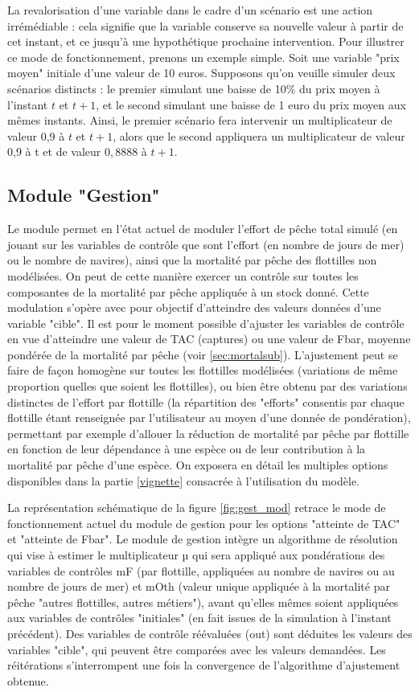 \documentclass[12pt, colorinlistoftodos, notitlepage]{report}
\newenvironment{not used}[1]{%
    \longtable{%
        |>{\centering$\displaystyle}A{#1}{1}<{$}%
        |}\hline\ignorespaces}{%
    \endlongtable\ignorespacesafterend}
\begin{document}
La revalorisation d'une variable dans le cadre d'un scénario est une action irrémédiable : cela signifie que la variable conserve sa nouvelle valeur à partir de cet instant, et ce jusqu'à une hypothétique prochaine intervention. Pour illustrer ce mode de fonctionnement, prenons un exemple simple. Soit une variable "prix moyen" initiale d'une valeur de 10 euros. Supposons qu'on veuille simuler deux scénarios distincts : le premier simulant une baisse de 10\% du prix moyen à l'instant $t$ et $t+1$, et le second simulant une baisse de 1 euro du prix moyen aux mêmes instants. Ainsi, le premier scénario fera intervenir un multiplicateur de valeur 0,9 à $t$ et $t+1$, alors que le second appliquera un multiplicateur de valeur 0,9 à t et de valeur $0,8888$ à $t+1$.

\subsection{Module "Gestion"}

Le module permet en l'état actuel de moduler l'effort de pêche total simulé (en jouant sur les variables de contrôle que sont l’effort (en nombre de jours de mer) ou le nombre de navires), ainsi que la mortalité par pêche des flottilles non modélisées. On peut de cette manière exercer un contrôle sur toutes les composantes de la mortalité par pêche appliquée à un stock donné. Cette modulation s'opère avec pour objectif d'atteindre des valeurs données d'une variable "cible". Il est pour le moment possible d'ajuster les variables de contrôle en vue d'atteindre une valeur de TAC (captures) ou une valeur de Fbar, moyenne pondérée de la mortalité par pêche (voir \ref{sec:mortalsub}). L'ajustement peut se faire de façon homogène sur toutes les flottilles modélisées (variations de même proportion quelles que soient les flottilles), ou bien être obtenu par des variations distinctes de l'effort par flottille (la répartition des "efforts" consentis par chaque flottille étant renseignée par l'utilisateur au moyen d'une donnée de pondération), permettant par exemple d'allouer la réduction de mortalité par pêche par flottille en fonction de leur dépendance à une espèce ou de leur contribution à la mortalité par pêche d’une espèce. On exposera en détail les multiples options disponibles dans la partie \ref{vignette} consacrée à l'utilisation du modèle.

La représentation schématique de la figure \ref{fig:gest_mod} retrace le mode de fonctionnement actuel du module de gestion pour les options "atteinte de TAC" et "atteinte de Fbar". Le module de gestion intègre un algorithme de résolution qui vise à estimer le multiplicateur µ qui sera appliqué aux pondérations des variables de contrôles mF (par flottille, appliquées au nombre de navires ou au nombre de jours de mer) et mOth  (valeur unique appliquée à la mortalité par pêche "autres flottilles, autres métiers"), avant qu'elles mêmes soient appliquées aux variables de contrôles "initiales" (en fait issues de la simulation à l'instant précédent). Des variables de contrôle réévaluées (out) sont déduites les valeurs des variables "cible", qui peuvent être comparées avec les valeurs demandées. Les réitérations s'interrompent une fois la convergence de l'algorithme d'ajustement obtenue.
\end{document}
